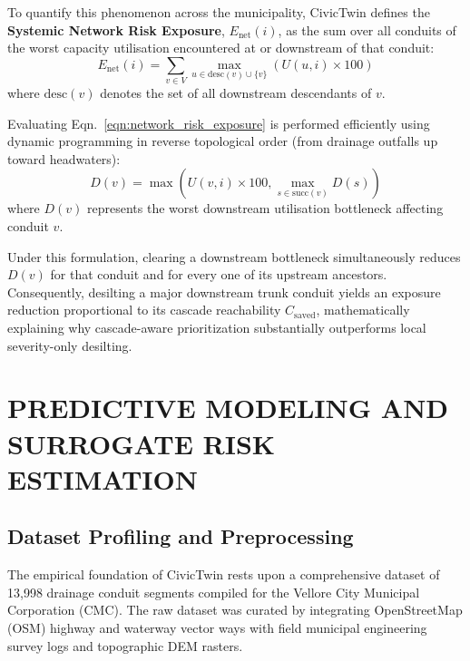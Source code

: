 \documentclass[12pt,a4paper]{report}
\begin{document}
To quantify this phenomenon across the municipality, CivicTwin defines the \textbf{Systemic Network Risk Exposure}, $E_{\text{net}}(i)$, as the sum over all conduits of the worst capacity utilisation encountered at or downstream of that conduit:
\begin{equation}
E_{\text{net}}(i) = \sum_{v \in V} \max_{u \in \text{desc}(v) \cup \{v\}} \left(U(u, i) \times 100\right)
\label{eqn:network_risk_exposure}
\end{equation}
where $\text{desc}(v)$ denotes the set of all downstream descendants of $v$. 

Evaluating Eqn.~\ref{eqn:network_risk_exposure} is performed efficiently using dynamic programming in reverse topological order (from drainage outfalls up toward headwaters):
\begin{equation}
D(v) = \max\left(U(v, i) \times 100, \max_{s \in \text{succ}(v)} D(s)\right)
\label{eqn:downstream_dp}
\end{equation}
where $D(v)$ represents the worst downstream utilisation bottleneck affecting conduit $v$.

Under this formulation, clearing a downstream bottleneck simultaneously reduces $D(v)$ for that conduit and for every one of its upstream ancestors. Consequently, desilting a major downstream trunk conduit yields an exposure reduction proportional to its cascade reachability $C_{\text{saved}}$, mathematically explaining why cascade-aware prioritization substantially outperforms local severity-only desilting.


\chapter{PREDICTIVE MODELING AND SURROGATE RISK ESTIMATION}

\section{Dataset Profiling and Preprocessing}
The empirical foundation of CivicTwin rests upon a comprehensive dataset of 13,998 drainage conduit segments compiled for the Vellore City Municipal Corporation (CMC). The raw dataset was curated by integrating OpenStreetMap (OSM) highway and waterway vector ways with field municipal engineering survey logs and topographic DEM rasters.
\end{document}
